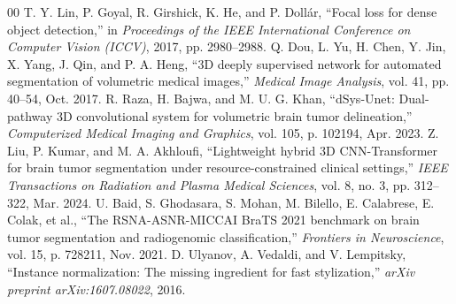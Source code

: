 \documentclass[conference]{IEEEtran}
\begin{document}
\begin{thebibliography}{00}
 T. Y. Lin, P. Goyal, R. Girshick, K. He, and P. Doll{\'a}r, ``Focal loss for dense object detection,'' in \emph{Proceedings of the IEEE International Conference on Computer Vision (ICCV)}, 2017, pp. 2980--2988.
 Q. Dou, L. Yu, H. Chen, Y. Jin, X. Yang, J. Qin, and P. A. Heng, ``3D deeply supervised network for automated segmentation of volumetric medical images,'' \emph{Medical Image Analysis}, vol. 41, pp. 40--54, Oct. 2017.
 R. Raza, H. Bajwa, and M. U. G. Khan, ``dSys-Unet: Dual-pathway 3D convolutional system for volumetric brain tumor delineation,'' \emph{Computerized Medical Imaging and Graphics}, vol. 105, p. 102194, Apr. 2023.
 Z. Liu, P. Kumar, and M. A. Akhloufi, ``Lightweight hybrid 3D CNN-Transformer for brain tumor segmentation under resource-constrained clinical settings,'' \emph{IEEE Transactions on Radiation and Plasma Medical Sciences}, vol. 8, no. 3, pp. 312--322, Mar. 2024.
 U. Baid, S. Ghodasara, S. Mohan, M. Bilello, E. Calabrese, E. Colak, et al., ``The RSNA-ASNR-MICCAI BraTS 2021 benchmark on brain tumor segmentation and radiogenomic classification,'' \emph{Frontiers in Neuroscience}, vol. 15, p. 728211, Nov. 2021.
 D. Ulyanov, A. Vedaldi, and V. Lempitsky, ``Instance normalization: The missing ingredient for fast stylization,'' \emph{arXiv preprint arXiv:1607.08022}, 2016.
\end{thebibliography}
\end{document}
